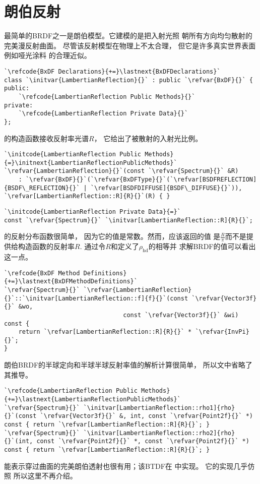 \section{朗伯反射}\label{sec:朗伯反射}

最简单的BRDF之一是朗伯模型。它建模的是把入射光照
朝所有方向均匀散射的完美漫反射曲面。
尽管该反射模型在物理上不太合理，
但它是许多真实世界表面例如哑光涂料
的合理近似。

\begin{lstlisting}
`\refcode{BxDF Declarations}{+=}\lastnext{BxDFDeclarations}`
class `\initvar{LambertianReflection}{}` : public `\refvar{BxDF}{}` {
public:
    `\refcode{LambertianReflection Public Methods}{}`
private:
    `\refcode{LambertianReflection Private Data}{}`
};
\end{lstlisting}

的构造函数接收反射率光谱$R$，
它给出了被散射的入射光比例。
\begin{lstlisting}
`\initcode{LambertianReflection Public Methods}{=}\initnext{LambertianReflectionPublicMethods}`
`\refvar{LambertianReflection}{}`(const `\refvar{Spectrum}{}` &R) 
    : `\refvar{BxDF}{}`(`\refvar{BxDFType}{}`(`\refvar[BSDFREFLECTION]{BSDF\_REFLECTION}{}` | `\refvar[BSDFDIFFUSE]{BSDF\_DIFFUSE}{}`)), `\refvar[LambertianReflection::R]{R}{}`(R) { }
\end{lstlisting}
\begin{lstlisting}
`\initcode{LambertianReflection Private Data}{=}`
const `\refvar{Spectrum}{}` `\initvar[LambertianReflection::R]{R}{}`;
\end{lstlisting}

的反射分布函数很简单，
因为它的值是常数。然而，应该返回的值
是$\displaystyle\frac{R}{\pi}$而不是提供给构造函数的反射率$R$.
通过令$R$和定义了$\rho_{\mathrm{hd}}$的相等并
求解BRDF的值可以看出这一点。
\begin{lstlisting}
`\refcode{BxDF Method Definitions}{+=}\lastnext{BxDFMethodDefinitions}`
`\refvar{Spectrum}{}` `\refvar{LambertianReflection}{}`::`\initvar[LambertianReflection::f]{f}{}`(const `\refvar{Vector3f}{}` &wo,
                                 const `\refvar{Vector3f}{}` &wi) const {
    return `\refvar[LambertianReflection::R]{R}{}` * `\refvar{InvPi}{}`;
}
\end{lstlisting}

朗伯BRDF的半球定向和半球半球反射率值的解析计算很简单，
所以文中省略了其推导。
\begin{lstlisting}
`\refcode{LambertianReflection Public Methods}{+=}\lastnext{LambertianReflectionPublicMethods}`
`\refvar{Spectrum}{}` `\initvar[LambertianReflection::rho1]{rho}{}`(const `\refvar{Vector3f}{}` &, int, const `\refvar{Point2f}{}` *) const { return `\refvar[LambertianReflection::R]{R}{}`; }
`\refvar{Spectrum}{}` `\initvar[LambertianReflection::rho2]{rho}{}`(int, const `\refvar{Point2f}{}` *, const `\refvar{Point2f}{}` *) const { return `\refvar[LambertianReflection::R]{R}{}`; }
\end{lstlisting}

能表示穿过曲面的完美朗伯透射也很有用；该BTDF在\linebreak
{}中实现。
它的实现几乎仿照
所以这里不再介绍。